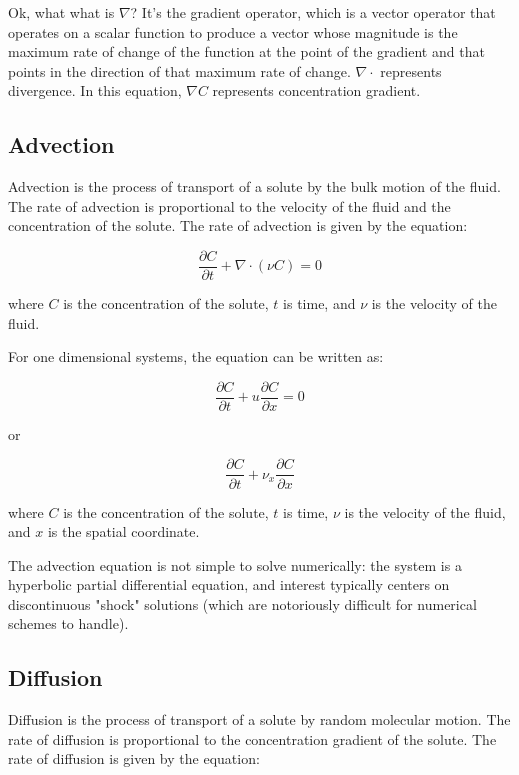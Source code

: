 \documentclass{tufte-handout}\usepackage[]{graphicx}\usepackage[]{xcolor}
\begin{document}
Ok, what what is $\nabla$? It's the gradient operator, which is a vector operator that operates on a scalar function to produce a vector whose magnitude is the maximum rate of change of the function at the point of the gradient and that points in the direction of that maximum rate of change. $\nabla \cdot$ represents divergence. In this equation, $\nabla C$ represents concentration gradient.

\subsection{Advection}

Advection is the process of transport of a solute by the bulk motion of the fluid. The rate of advection is proportional to the velocity of the fluid and the concentration of the solute. The rate of advection is given by the equation:

\begin{equation}
\frac{\partial C}{\partial t} + \nabla \cdot (\nu C) = 0
\end{equation}

where $C$ is the concentration of the solute, $t$ is time, and $\nu$ is the velocity of the fluid. 

For one dimensional systems, the equation can be written as:

\begin{equation}
\frac{\partial C}{\partial t} + u \frac{\partial C}{\partial x} = 0
\end{equation}

or

\begin{equation}
\frac{\partial C}{\partial t} + \nu_x \frac{\partial C}{\partial x}
\end{equation}

where $C$ is the concentration of the solute, $t$ is time, $\nu$ is the velocity of the fluid, and $x$ is the spatial coordinate.

The advection equation is not simple to solve numerically: the system is a hyperbolic partial differential equation, and interest typically centers on discontinuous "shock" solutions (which are notoriously difficult for numerical schemes to handle).


\subsection{Diffusion}

Diffusion is the process of transport of a solute by random molecular motion. The rate of diffusion is proportional to the concentration gradient of the solute. The rate of diffusion is given by the equation:
\end{document}
